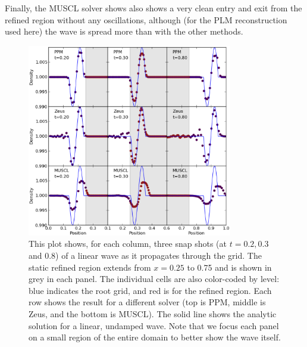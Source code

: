 Finally, the MUSCL solver shows also shows a very clean entry and exit from the refined region without any oscillations, although (for the PLM reconstruction used here) the wave is spread more than with the other methods.

\begin{figure}
\begin{center}
\includegraphics[width=0.8\textwidth]{figures/WavePool.eps}
\caption{This plot shows, for each column, three snap shots (at $t=0.2, 0.3$ and 0.8) of a linear wave as it propagates through the grid.  The static refined region extends from $x = 0.25$ to 0.75 and is shown in grey in each panel.  The individual cells are also color-coded by level: blue indicates the root grid, and red is for the refined region.  Each row shows the result for a different solver (top is PPM, middle is Zeus, and the bottom is MUSCL).   The solid line shows the analytic solution for a linear, undamped wave.  Note that we focus each panel on a small region of the entire domain to better show the wave itself.}
\label{fig.wavepool}
\end{center}
\end{figure}
